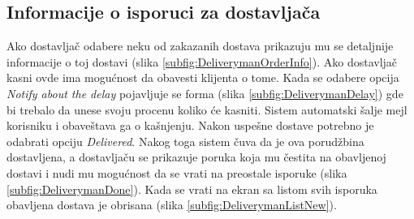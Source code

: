 \subsection{Informacije o isporuci za dostavljača}

Ako dostavljač odabere neku od zakazanih dostava prikazuju mu se detaljnije informacije o toj dostavi (slika \ref{subfig:DeliverymanOrderInfo}).
Ako dostavljač kasni ovde ima mogućnost da obavesti klijenta o tome. Kada se odabere opcija \textit{Notify about the delay} pojavljuje se forma (slika \ref{subfig:DeliverymanDelay}) gde bi trebalo da unese svoju procenu koliko će kasniti. Sistem automatski šalje mejl korisniku i obaveštava ga o kašnjenju.
Nakon uspešne dostave potrebno je odabrati opciju \textit{Delivered}. Nakog toga sistem čuva da je ova porudžbina dostavljena, a dostavljaču se prikazuje poruka koja mu čestita na obavljenoj dostavi i nudi mu mogućnost da se vrati na preostale isporuke (slika \ref{subfig:DeliverymanDone}). Kada se vrati na ekran sa listom svih isporuka obavljena dostava je obrisana (slika \ref{subfig:DeliverymanListNew}).




